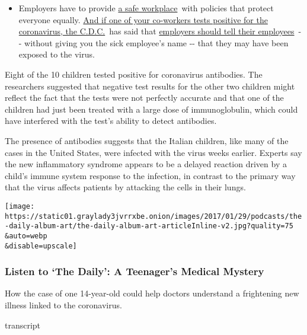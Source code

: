 \begin{itemize}
  \begin{itemize}
  \tightlist
  \item
    Employers have to provide
    \href{https://www.osha.gov/SLTC/covid-19/standards.html}{a safe
    workplace}~with policies that protect everyone equally.
    \href{https://www.nytimes3xbfgragh.onion/article/coronavirus-money-unemployment.html?action=click\&pgtype=Article\&state=default\&region=MAIN_CONTENT_3\&context=storylines_faq}{And
    if one of your co-workers tests positive for the coronavirus, the
    C.D.C.}~has said that
    \href{https://www.cdc.gov/coronavirus/2019-ncov/community/guidance-business-response.html}{employers
    should tell their employees}~-\/- without giving you the sick
    employee's name -\/- that they may have been exposed to the virus.
  \end{itemize}
\end{itemize}

Eight of the 10 children tested positive for coronavirus antibodies. The
researchers suggested that negative test results for the other two
children might reflect the fact that the tests were not perfectly
accurate and that one of the children had just been treated with a large
dose of immunoglobulin, which could have interfered with the test's
ability to detect antibodies.

The presence of antibodies suggests that the Italian children, like many
of the cases in the United States, were infected with the virus weeks
earlier. Experts say the new inflammatory syndrome appears to be a
delayed reaction driven by a child's immune system response to the
infection, in contrast to the primary way that the virus affects
patients by attacking the cells in their lungs.

\texttt{[image: https://static01.graylady3jvrrxbe.onion/images/2017/01/29/podcasts/the-daily-album-art/the-daily-album-art-articleInline-v2.jpg?quality=75\\\&auto=webp\\\&disable=upscale]}

\hypertarget{listen-to-the-daily-a-teenagers-medical-mystery}{%
\subsubsection{Listen to `The Daily': A Teenager's Medical
Mystery}\label{listen-to-the-daily-a-teenagers-medical-mystery}}

How the case of one 14-year-old could help doctors understand a
frightening new illness linked to the coronavirus.

transcript

